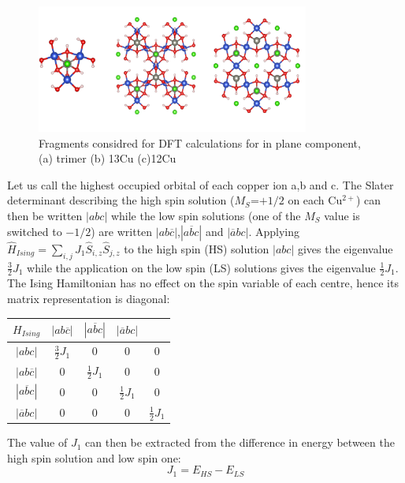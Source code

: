 \documentclass[10pt]{report}
\numberwithin{equation}{section}
\begin{document}
\begin{figure}[h!]
    \centering
    \includegraphics[width=0.8\textwidth]{Images/FragmentDFT_plan.png}
    \caption{Fragments considred for DFT calculations for in plane component, (a) trimer (b) 13Cu (c)12Cu}
    \label{FragmentDFT}
\end{figure}

Let us call the highest occupied orbital of each copper ion a,b and c. 
The Slater determinant describing the high spin solution ($M_S$=$+1/2$ on each Cu$^{2+}$) can then be written $|abc|$ while the low spin solutions (one of the $M_S$ value is switched to $-1/2$) are written $|ab\overline{c}|$,$|a\overline{b}c|$ and $|\overline{a}bc|$.
Applying $\hat{H}_{Ising}=\sum_{i,j}J_1 \hat{S}_{i,z}\hat{S}_{j,z}$ to the high spin (HS) solution $|abc|$ gives the eigenvalue $\frac{3}{2}J_1$ while the application on the low spin (LS) solutions gives the eigenvalue $\frac{1}{2}J_1$. 
The Ising Hamiltonian has no effect on the spin variable of each centre, hence its matrix representation is diagonal:

\begin{center}
    \begin{tabular}{c | c c c c}
        $H_{Ising}$ &$|ab\overline{c}|$&$|a\overline{b}c|$ & $|\overline{a}bc|$\\
        \hline
        $|abc|$ & $\frac{3}{2}J_1$ & 0 & 0 & 0\\
        $|ab\overline{c}|$ & 0 & $\frac{1}{2}J_1 $& 0 & 0\\
        $|a\overline{b}c|$ & 0 & 0 & $\frac{1}{2}J_1 $ & 0 \\
        $|\overline{a}bc|$ & 0 & 0 & 0 & $\frac{1}{2}J_1 $
    \end{tabular}
\end{center}

The value of $J_1$ can then be extracted from the difference in energy between the high spin solution and low spin one:
\begin{equation}
    J_1=E_{HS}-E_{LS}
\end{equation}
\end{document}

